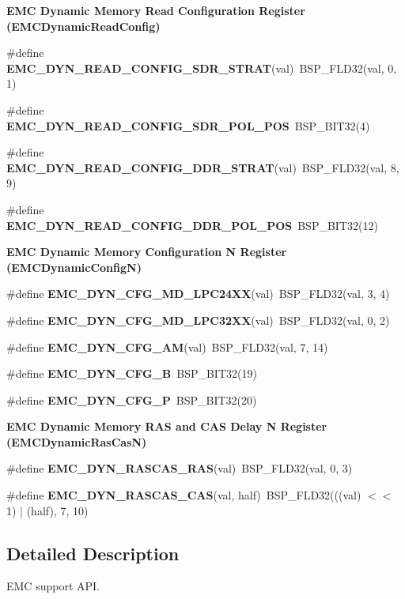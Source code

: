 \begin{Indent}\textbf{ E\+MC Dynamic Memory Read Configuration Register (E\+M\+C\+Dynamic\+Read\+Config)}\par
\begin{DoxyCompactItemize}
\item 
\#define {\bfseries E\+M\+C\+\_\+\+D\+Y\+N\+\_\+\+R\+E\+A\+D\+\_\+\+C\+O\+N\+F\+I\+G\+\_\+\+S\+D\+R\+\_\+\+S\+T\+R\+AT}(val)~B\+S\+P\+\_\+\+F\+L\+D32(val, 0, 1)
\item 
\#define {\bfseries E\+M\+C\+\_\+\+D\+Y\+N\+\_\+\+R\+E\+A\+D\+\_\+\+C\+O\+N\+F\+I\+G\+\_\+\+S\+D\+R\+\_\+\+P\+O\+L\+\_\+\+P\+OS}~B\+S\+P\+\_\+\+B\+I\+T32(4)
\item 
\#define {\bfseries E\+M\+C\+\_\+\+D\+Y\+N\+\_\+\+R\+E\+A\+D\+\_\+\+C\+O\+N\+F\+I\+G\+\_\+\+D\+D\+R\+\_\+\+S\+T\+R\+AT}(val)~B\+S\+P\+\_\+\+F\+L\+D32(val, 8, 9)
\item 
\#define {\bfseries E\+M\+C\+\_\+\+D\+Y\+N\+\_\+\+R\+E\+A\+D\+\_\+\+C\+O\+N\+F\+I\+G\+\_\+\+D\+D\+R\+\_\+\+P\+O\+L\+\_\+\+P\+OS}~B\+S\+P\+\_\+\+B\+I\+T32(12)
\end{DoxyCompactItemize}
\end{Indent}
\begin{Indent}\textbf{ E\+MC Dynamic Memory Configuration N Register (E\+M\+C\+Dynamic\+ConfigN)}\par
\begin{DoxyCompactItemize}
\item 
\#define {\bfseries E\+M\+C\+\_\+\+D\+Y\+N\+\_\+\+C\+F\+G\+\_\+\+M\+D\+\_\+\+L\+P\+C24\+XX}(val)~B\+S\+P\+\_\+\+F\+L\+D32(val, 3, 4)
\item 
\#define {\bfseries E\+M\+C\+\_\+\+D\+Y\+N\+\_\+\+C\+F\+G\+\_\+\+M\+D\+\_\+\+L\+P\+C32\+XX}(val)~B\+S\+P\+\_\+\+F\+L\+D32(val, 0, 2)
\item 
\#define {\bfseries E\+M\+C\+\_\+\+D\+Y\+N\+\_\+\+C\+F\+G\+\_\+\+AM}(val)~B\+S\+P\+\_\+\+F\+L\+D32(val, 7, 14)
\item 
\#define {\bfseries E\+M\+C\+\_\+\+D\+Y\+N\+\_\+\+C\+F\+G\+\_\+B}~B\+S\+P\+\_\+\+B\+I\+T32(19)
\item 
\#define {\bfseries E\+M\+C\+\_\+\+D\+Y\+N\+\_\+\+C\+F\+G\+\_\+P}~B\+S\+P\+\_\+\+B\+I\+T32(20)
\end{DoxyCompactItemize}
\end{Indent}
\begin{Indent}\textbf{ E\+MC Dynamic Memory R\+AS and C\+AS Delay N Register (E\+M\+C\+Dynamic\+Ras\+CasN)}\par
\begin{DoxyCompactItemize}
\item 
\#define {\bfseries E\+M\+C\+\_\+\+D\+Y\+N\+\_\+\+R\+A\+S\+C\+A\+S\+\_\+\+R\+AS}(val)~B\+S\+P\+\_\+\+F\+L\+D32(val, 0, 3)
\item 
\#define {\bfseries E\+M\+C\+\_\+\+D\+Y\+N\+\_\+\+R\+A\+S\+C\+A\+S\+\_\+\+C\+AS}(val,  half)~B\+S\+P\+\_\+\+F\+L\+D32(((val) $<$$<$ 1) $\vert$ (half), 7, 10)
\end{DoxyCompactItemize}
\end{Indent}


\subsection{Detailed Description}
E\+MC support A\+PI. 

